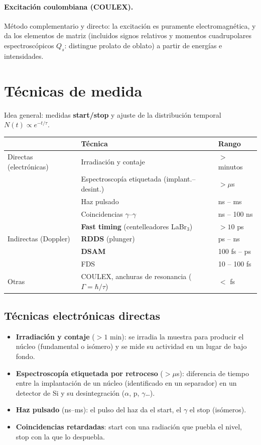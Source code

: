 \paragraph{Excitación coulombiana (COULEX).} Método complementario y directo: la excitación es puramente electromagnética, y da los elementos de
matriz (incluidos signos relativos y momentos cuadrupolares espectroscópicos $Q_s$: distingue prolato de oblato) a partir de energías e intensidades.

\section{Técnicas de medida}
\begin{clave}
Idea general: medidas \textbf{start/stop} y ajuste de la distribución temporal $N(t)\propto e^{-t/\tau}$.
\begin{center}\small
\begin{tabular}{p{2.6cm}p{7.2cm}p{3.6cm}}
\toprule
& Técnica & Rango\\
\midrule
Directas (electrónicas) & Irradiación y contaje & $>$ minutos\\
& Espectroscopía etiquetada (implant.--desint.) & $>\mu$s\\
& Haz pulsado & ns -- ms\\
& Coincidencias $\gamma$--$\gamma$ & ns -- 100 ns\\
& \textbf{Fast timing} (centelleadores LaBr$_3$) & $>10$ ps\\
\midrule
Indirectas (Doppler) & \textbf{RDDS} (plunger) & ps -- ns\\
& \textbf{DSAM} & 100 fs -- ps\\
& FDS & 10 -- 100 fs\\
\midrule
Otras & COULEX, anchuras de resonancia ($\Gamma=\hbar/\tau$) & $<$ fs\\
\bottomrule
\end{tabular}
\end{center}
\end{clave}

\subsection{Técnicas electrónicas directas}
\begin{itemize}
\item \textbf{Irradiación y contaje} ($>1$ min): se irradia la muestra para producir el núcleo (fundamental o isómero) y se mide su actividad en un lugar de bajo fondo.
\item \textbf{Espectroscopía etiquetada por retroceso} ($>\mu$s): diferencia de tiempo entre la implantación de un núcleo (identificado en un separador) en un detector
de Si y su desintegración ($\alpha$, p, $\gamma$\dots).
\item \textbf{Haz pulsado} (ns--ms): el pulso del haz da el start, el $\gamma$ el stop (isómeros).
\item \textbf{Coincidencias retardadas}: start con una radiación que puebla el nivel, stop con la que lo despuebla.
\end{itemize}

